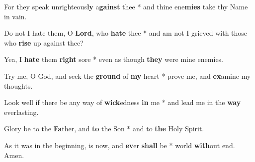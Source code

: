 \begin{multicols}{2}
	For they speak unrighteous\textbf{ly} a\textbf{gainst} thee * and thine ene\textbf{mies} take thy Name in vain.
	
	Do not I hate them, O \textbf{Lord}, who \textbf{hate} thee * and am not I grieved with those who \textbf{rise} up against thee?
	
	Yea, I \textbf{hate} them \textbf{right} sore * even as though \textbf{they} were mine enemies.
	
	Try me, O God, and seek the \textbf{ground} of \textbf{my} heart * prove me, and \textbf{ex}amine my thoughts.
	
	Look well if there be any way of \textbf{wick}edness \textbf{in} me * and lead me in the \textbf{way} everlasting.
	
	Glory be to the \textbf{Fa}ther, and \textbf{to} the Son * and to \textbf{the} Holy Spirit.
	
	As it was in the beginning, is now, and \textbf{ev}er \textbf{shall} be * world \textbf{with}out end. Amen.
\end{multicols}